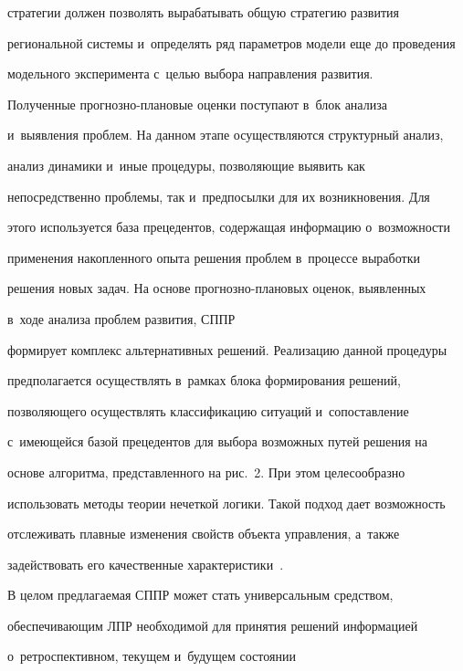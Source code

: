 стратегии должен позволять вырабатывать общую стратегию развития 


региональной сис\-те\-мы и~определять ряд па\-ра\-мет\-ров модели еще до проведения 


модельного эксперимента с~целью выбора на\-прав\-ле\-ния развития. 


  


  Полученные прогнозно-пла\-но\-вые оценки поступают в~блок анализа 


и~выявления проб\-лем. На данном этапе осуществляются структурный анализ, 


анализ динамики и~иные процедуры, позволяющие выявить как 


непосредственно проб\-ле\-мы, так и~предпосылки для их возникновения. Для 


этого используется база прецедентов, содержащая информацию о~возможности 


применения накопленного опыта решения проб\-лем в~процессе выработки 


решения новых задач. На основе прог\-ноз\-но-пла\-но\-вых оценок, выявленных 


в~ходе анализа проблем развития, СППР


формирует комплекс альтернативных решений. Реализацию данной процедуры 


предполагается осуществлять в~рамках блока формирования решений, 


позволяющего осуществлять классификацию ситуаций и~со\-по\-став\-ле\-ние 


с~имеющейся базой прецедентов для выбора возможных путей решения на 


основе алгоритма, пред\-став\-лен\-но\-го на рис.~2. При этом целесообразно 


использовать методы тео\-рии нечеткой логики. Такой подход дает воз\-мож\-ность 


отслеживать плав\-ные изменения свойств объекта управ\-ле\-ния, а~также 


задействовать его качественные характеристики~\cite{9-or}. 


  


  В целом предлагаемая СППР может стать универсальным средством, 


обеспечивающим ЛПР необходимой для принятия решений информацией 


о~ретроспективном, текущем и~будущем со\-сто\-янии 


